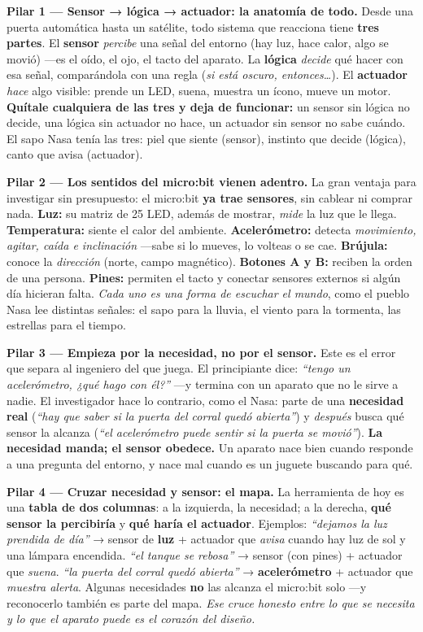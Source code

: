 \documentclass[11pt,letterpaper]{article}
\newcommand{\milcpaso}[3]{%
\Needspace{4\baselineskip}%
\begin{tcolorbox}[enhanced,colback=white,colframe=milcLinea,arc=1.5mm,boxrule=.9pt,
  left=14mm,right=4mm,top=3mm,bottom=3mm,before skip=4pt,after skip=4pt,
  fontupper=\RaggedRight,
  overlay={\node[anchor=north west,circle,fill=#2,text=white,inner sep=0pt,
    minimum size=7.4mm,font=\sffamily\bfseries\small]
    at ([xshift=3.6mm,yshift=-3.2mm]frame.north west) {#1};}]
#3
\end{tcolorbox}}
\begin{document}
\milcpaso{1}{milcTurquesa}{\textbf{Pilar 1 --- Sensor → lógica → actuador: la anatomía de todo.} Desde una puerta automática hasta un satélite, todo sistema que reacciona tiene \textbf{tres partes}. El \textbf{sensor} \emph{percibe} una señal del entorno (hay luz, hace calor, algo se movió) ---es el oído, el ojo, el tacto del aparato. La \textbf{lógica} \emph{decide} qué hacer con esa señal, comparándola con una regla (\emph{si está oscuro, entonces\ldots}). El \textbf{actuador} \emph{hace} algo visible: prende un LED, suena, muestra un ícono, mueve un motor. \textbf{Quítale cualquiera de las tres y deja de funcionar:} un sensor sin lógica no decide, una lógica sin actuador no hace, un actuador sin sensor no sabe cuándo. El sapo Nasa tenía las tres: piel que siente (sensor), instinto que decide (lógica), canto que avisa (actuador).}
\milcpaso{2}{milcTurquesa}{\textbf{Pilar 2 --- Los sentidos del micro:bit vienen adentro.} La gran ventaja para investigar sin presupuesto: el micro:bit \textbf{ya trae sensores}, sin cablear ni comprar nada. \textbf{Luz:} su matriz de 25 LED, además de mostrar, \emph{mide} la luz que le llega. \textbf{Temperatura:} siente el calor del ambiente. \textbf{Acelerómetro:} detecta \emph{movimiento, agitar, caída e inclinación} ---sabe si lo mueves, lo volteas o se cae. \textbf{Brújula:} conoce la \emph{dirección} (norte, campo magnético). \textbf{Botones A y B:} reciben la orden de una persona. \textbf{Pines:} permiten el tacto y conectar sensores externos si algún día hicieran falta. \emph{Cada uno es una forma de escuchar el mundo}, como el pueblo Nasa lee distintas señales: el sapo para la lluvia, el viento para la tormenta, las estrellas para el tiempo.}
\milcpaso{3}{milcTurquesa}{\textbf{Pilar 3 --- Empieza por la necesidad, no por el sensor.} Este es el error que separa al ingeniero del que juega. El principiante dice: \emph{``tengo un acelerómetro, ¿qué hago con él?''} ---y termina con un aparato que no le sirve a nadie. El investigador hace lo contrario, como el Nasa: parte de una \textbf{necesidad real} (\emph{``hay que saber si la puerta del corral quedó abierta''}) y \emph{después} busca qué sensor la alcanza (\emph{``el acelerómetro puede sentir si la puerta se movió''}). \textbf{La necesidad manda; el sensor obedece.} Un aparato nace bien cuando responde a una pregunta del entorno, y nace mal cuando es un juguete buscando para qué.}
\milcpaso{4}{milcTurquesa}{\textbf{Pilar 4 --- Cruzar necesidad y sensor: el mapa.} La herramienta de hoy es una \textbf{tabla de dos columnas}: a la izquierda, la necesidad; a la derecha, \textbf{qué sensor la percibiría} y \textbf{qué haría el actuador}. Ejemplos: \emph{``dejamos la luz prendida de día''} → sensor de \textbf{luz} + actuador que \emph{avisa} cuando hay luz de sol y una lámpara encendida. \emph{``el tanque se rebosa''} → sensor (con pines) + actuador que \emph{suena}. \emph{``la puerta del corral quedó abierta''} → \textbf{acelerómetro} + actuador que \emph{muestra alerta}. Algunas necesidades \textbf{no} las alcanza el micro:bit solo ---y reconocerlo también es parte del mapa. \emph{Ese cruce honesto entre lo que se necesita y lo que el aparato puede es el corazón del diseño.}}
\end{document}
